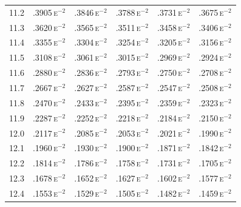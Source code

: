 \begin{minipage}[t]{95mm}
{\begin{tabular}{cccccc}
        11.2           & .3905\,\textsc{e}$^{-2}$ & .3846\,\textsc{e}$^{-2}$ & .3788\,\textsc{e}$^{-2}$ & .3731\,\textsc{e}$^{-2}$ & .3675\,\textsc{e}$^{-2}$ \\
        11.3           & .3620\,\textsc{e}$^{-2}$ & .3565\,\textsc{e}$^{-2}$ & .3511\,\textsc{e}$^{-2}$ & .3458\,\textsc{e}$^{-2}$ & .3406\,\textsc{e}$^{-2}$ \\
        11.4           & .3355\,\textsc{e}$^{-2}$ & .3304\,\textsc{e}$^{-2}$ & .3254\,\textsc{e}$^{-2}$ & .3205\,\textsc{e}$^{-2}$ & .3156\,\textsc{e}$^{-2}$ \\
        11.5           & .3108\,\textsc{e}$^{-2}$ & .3061\,\textsc{e}$^{-2}$ & .3015\,\textsc{e}$^{-2}$ & .2969\,\textsc{e}$^{-2}$ & .2924\,\textsc{e}$^{-2}$ \\
        11.6           & .2880\,\textsc{e}$^{-2}$ & .2836\,\textsc{e}$^{-2}$ & .2793\,\textsc{e}$^{-2}$ & .2750\,\textsc{e}$^{-2}$ & .2708\,\textsc{e}$^{-2}$ \\
        11.7           & .2667\,\textsc{e}$^{-2}$ & .2627\,\textsc{e}$^{-2}$ & .2587\,\textsc{e}$^{-2}$ & .2547\,\textsc{e}$^{-2}$ & .2508\,\textsc{e}$^{-2}$ \\
        11.8           & .2470\,\textsc{e}$^{-2}$ & .2433\,\textsc{e}$^{-2}$ & .2395\,\textsc{e}$^{-2}$ & .2359\,\textsc{e}$^{-2}$ & .2323\,\textsc{e}$^{-2}$ \\
        11.9           & .2287\,\textsc{e}$^{-2}$ & .2252\,\textsc{e}$^{-2}$ & .2218\,\textsc{e}$^{-2}$ & .2184\,\textsc{e}$^{-2}$ & .2150\,\textsc{e}$^{-2}$ \\[1.5ex]
        12.0           & .2117\,\textsc{e}$^{-2}$ & .2085\,\textsc{e}$^{-2}$ & .2053\,\textsc{e}$^{-2}$ & .2021\,\textsc{e}$^{-2}$ & .1990\,\textsc{e}$^{-2}$ \\
        12.1           & .1960\,\textsc{e}$^{-2}$ & .1930\,\textsc{e}$^{-2}$ & .1900\,\textsc{e}$^{-2}$ & .1871\,\textsc{e}$^{-2}$ & .1842\,\textsc{e}$^{-2}$ \\
        12.2           & .1814\,\textsc{e}$^{-2}$ & .1786\,\textsc{e}$^{-2}$ & .1758\,\textsc{e}$^{-2}$ & .1731\,\textsc{e}$^{-2}$ & .1705\,\textsc{e}$^{-2}$ \\
        12.3           & .1678\,\textsc{e}$^{-2}$ & .1652\,\textsc{e}$^{-2}$ & .1627\,\textsc{e}$^{-2}$ & .1602\,\textsc{e}$^{-2}$ & .1577\,\textsc{e}$^{-2}$ \\
        12.4           & .1553\,\textsc{e}$^{-2}$ & .1529\,\textsc{e}$^{-2}$ & .1505\,\textsc{e}$^{-2}$ & .1482\,\textsc{e}$^{-2}$ & .1459\,\textsc{e}$^{-2}$ \\

\end{tabular}}
\end{minipage}
